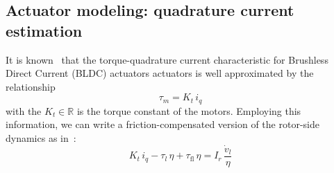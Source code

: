 \subsection{Actuator modeling: quadrature current estimation}
It is known~\cite{foc::krause2013analysis} that the torque-quadrature current characteristic for Brushless Direct Current (BLDC) actuators actuators is well approximated by the relationship
\begin{equation}\label{eq:torque_iq}
\tau_m = K_t\,i_q
\end{equation}
with the $K_t\in\mathbb{R}$ is the torque constant of the motors.
Employing this information, we can write a friction-compensated version of the rotor-side dynamics as in~\cite{friction_comp::le2008friction}:
\begin{equation}\label{eq:rotor_dyn_friction}
    K_t\,i_q  - \tau_l\,\eta + 
\tau_{\mathrm{fl}} \, \eta = I_r\,\dfrac{\dot{v}_l}{\eta}
\end{equation}
